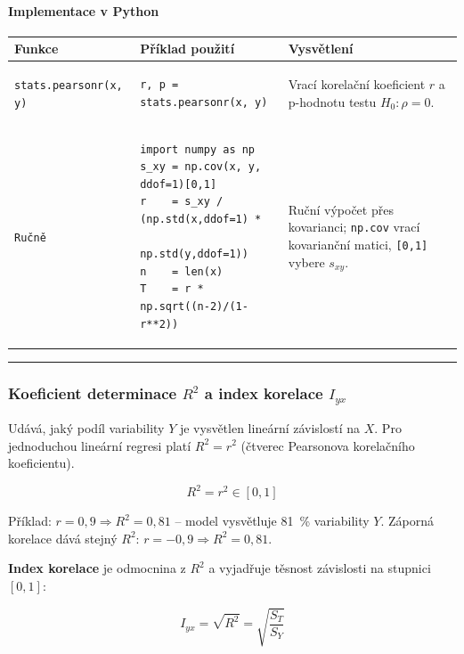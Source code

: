\documentclass[a4paper, 11pt]{article}
\newenvironment{funkcedict}
{%
  \begingroup
  \renewcommand{\arraystretch}{1.4}%
  \lstset{basicstyle=\ttfamily\small, columns=fullflexible}%
  \setlength{\tabcolsep}{4pt}%
  \begin{tabular}{p{0.19\textwidth} p{0.38\textwidth} p{0.30\textwidth}}
  \textbf{Funkce} & \textbf{Příklad použití} & \textbf{Vysvětlení} \\
  \midrule
}
{%
  \end{tabular}%
  \endgroup
}
\begin{document}
\paragraph{Implementace v Python}\mbox{}\par

\begin{funkcedict}

	\texttt{stats.pearsonr(x, y)} &
	\begin{lstlisting}
r, p = stats.pearsonr(x, y)
	\end{lstlisting}
	& Vrací korelační koeficient $r$ a p-hodnotu testu $H_0\colon \rho = 0$. \\

	\texttt{Ručně} &
	\begin{lstlisting}
import numpy as np
s_xy = np.cov(x, y, ddof=1)[0,1]
r    = s_xy / (np.std(x,ddof=1) *
               np.std(y,ddof=1))
n    = len(x)
T    = r * np.sqrt((n-2)/(1-r**2))
	\end{lstlisting}
	& Ruční výpočet přes kovarianci; \texttt{np.cov} vrací kovarianční matici, \texttt{[0,1]} vybere $s_{xy}$. \\

\end{funkcedict}

\noindent\hrule\medskip

\subsubsection{Koeficient determinace $R^2$ a index korelace $I_{yx}$}

Udává, jaký podíl variability $Y$ je vysvětlen lineární závislostí na $X$.
Pro jednoduchou lineární regresi platí $R^2 = r^2$ (čtverec Pearsonova korelačního koeficientu).

\begin{equation*}
	R^2 = r^2 \in [0, 1]
\end{equation*}

\noindent Příklad: $r = 0{,}9 \Rightarrow R^2 = 0{,}81$ -- model vysvětluje 81~\% variability $Y$.
Záporná korelace dává stejný $R^2$: $r = -0{,}9 \Rightarrow R^2 = 0{,}81$.

\medskip
\textbf{Index korelace} je odmocnina z $R^2$ a vyjadřuje těsnost závislosti na stupnici $[0,1]$:

\begin{equation*}
	I_{yx} = \sqrt{R^2} = \sqrt{\frac{S_T}{S_Y}}
\end{equation*}
\end{document}
